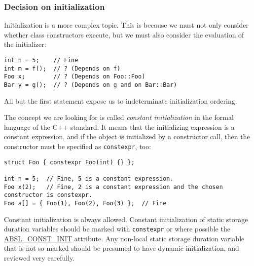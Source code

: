     \subsubsection{Decision on initialization}
    Initialization is a more complex topic. This is because we must not only consider whether class constructors execute, but we must also consider the evaluation of the initializer:
\begin{verbatim}
int n = 5;    // Fine
int m = f();  // ? (Depends on f)
Foo x;        // ? (Depends on Foo::Foo)
Bar y = g();  // ? (Depends on g and on Bar::Bar)
    \end{verbatim}
    All but the first statement expose us to indeterminate initialization ordering.

    The concept we are looking for is called \emph{constant initialization} in the formal language of the C++ standard. It means that the initializing expression is a constant expression, and if the object is initialized by a constructor call, then the constructor must be specified as \texttt{constexpr}, too:
\begin{verbatim}
struct Foo { constexpr Foo(int) {} };

int n = 5;  // Fine, 5 is a constant expression.
Foo x(2);   // Fine, 2 is a constant expression and the chosen constructor is constexpr.
Foo a[] = { Foo(1), Foo(2), Foo(3) };  // Fine
    \end{verbatim}
    Constant initialization is always allowed. Constant initialization of static storage duration variables should be marked with \texttt{constexpr} or where possible the \href{https://github.com/abseil/abseil-cpp/blob/03c1513538584f4a04d666be5eb469e3979febba/absl/base/attributes.h#L540}{ABSL\_CONST\_INIT} attribute. Any non-local static storage duration variable that is not so marked should be presumed to have dynamic initialization, and reviewed very carefully.

